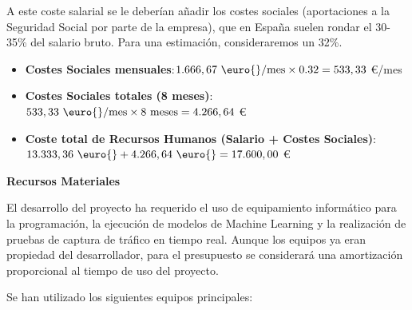 A este coste salarial se le deberían añadir los costes sociales (aportaciones a la Seguridad Social por parte de la empresa), que en España suelen rondar el 30-35\% del salario bruto. Para una estimación, consideraremos un 32\%.
\begin{itemize}
    
    \item\textbf{Costes Sociales mensuales}:$\displaystyle 1.666,67 \text{ \euro{}/mes} \times 0.32 = 533,33 $ \euro{}/mes
    
    \item\textbf{Costes Sociales totales (8 meses)}:$\displaystyle 533,33 \text{ \euro{}/mes} \times 8 \text{ meses} = 4.266,64 $ \euro{}
    
    \item\textbf{Coste total de Recursos Humanos (Salario + Costes Sociales)}:$\displaystyle 13.333,36 \text{ \euro{}} + 4.266,64 \text{ \euro{}} = 17.600,00 $ \euro{}
    
\end{itemize}

\textbf{Recursos Materiales}
 
El desarrollo del proyecto ha requerido el uso de equipamiento informático para la programación, la ejecución de modelos de Machine Learning y la realización de pruebas de captura de tráfico en tiempo real. Aunque los equipos ya eran propiedad del desarrollador, para el presupuesto se considerará una amortización proporcional al tiempo de uso del proyecto.

Se han utilizado los siguientes equipos principales:

